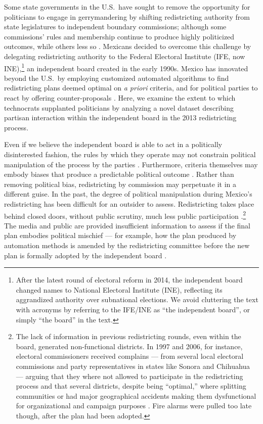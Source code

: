 \documentclass[letter,12pt]{article}
\begin{document}
Some state governments in the U.S.\ have sought to remove the opportunity for politicians to engage in gerrymandering by shifting redistricting authority from state legislatures to independent boundary commissions; although some commissions' rules and membership continue to produce highly politicized outcomes, while others less so \citep{mcdonald.CommVsLegisRedistrict2004,trelles.mtz.polygob2012}. Mexicans decided to overcome this challenge by delegating redistricting authority to the Federal Electoral Institute (IFE, now INE),\footnote{After the latest round of electoral reform in 2014, the independent board changed names to National Electoral Institute (INE), reflecting its aggrandized authority over subnational elections. We avoid cluttering the text with acronyms by referring to the IFE/INE as ``the independent board'', or simply ``the board'' in the text.} an independent board created in the early 1990s. Mexico has innovated beyond the U.S.\ by employing customized automated algorithms to find redistricting plans deemed optimal on \emph{a priori} criteria, and for political parties to react by offering counter-proposals \citep{trelles.mtz.polygob2012}. Here, we examine the extent to which technocrats supplanted politicians \citep{lujambio.vives.2008} by analyzing a novel dataset describing partisan interaction within the independent board in the 2013 redistricting process.

Even if we believe the independent board is able to act in a politically disinterested fashion, the rules by which they operate may not constrain political manipulation of the process by the parties \citep{lijphart.1990,rossiter.etal.1997,estevez.magar.rosas.2008}. Furthermore, criteria themselves may embody biases that produce a predictable political outcome \citep{parker.1990}. Rather than removing political bias, redistricting by commission may perpetuate it in a different guise. In the past, the degree of political manipulation during Mexico's redistricting has been difficult for an outsider to assess. Redistricting takes place behind closed doors, without public scrutiny, much less public participation \citep{trelles.mtz.tesisItam.2007,trelles.datosabiertos.2015}.\footnote{The lack of information in previous redistricting rounds, even within the board, generated non-functional districts. In 1997 and 2006, for instance, electoral commissioners received complains --- from several local electoral commissions and party representatives in states like Sonora and Chihuahua --- arguing that they where not allowed to participate in the redistricting process and that several districts, despite being ``optimal,'' where splitting communities or had major geographical accidents making them dysfunctional for organizational and campaign purposes \citep{trelles.mtz.tesisItam.2007}. Fire alarms were pulled too late though, after the plan had been adopted.} The media and public are provided insufficient information to assess if the final plan embodies political mischief --- for example, how the plan produced by automation methods is amended by the redistricting committee before the new plan is formally adopted by the independent board \citep{trelles.datosabiertos.2015}.
\end{document}
